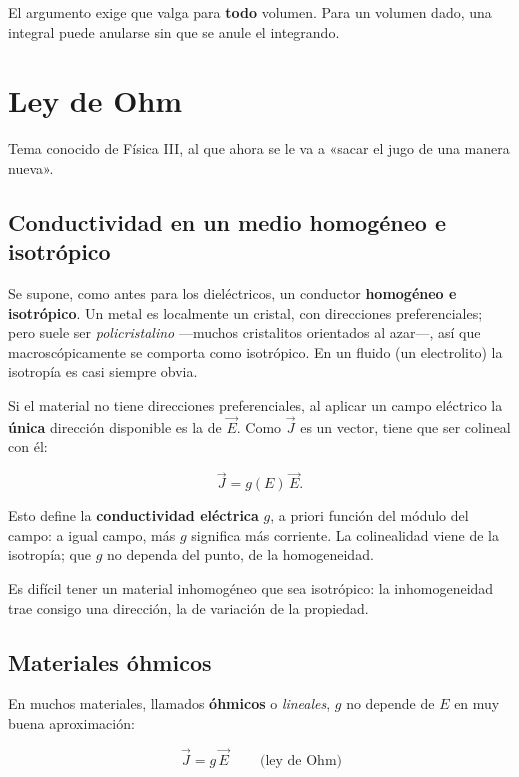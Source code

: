 \documentclass[12pt,a4paper]{article}
\begin{document}
\begin{notebox}
El argumento exige que valga para \textbf{todo} volumen. Para un volumen dado, una
integral puede anularse sin que se anule el integrando.
\end{notebox}

\section{Ley de Ohm}

Tema conocido de Física III, al que ahora se le va a «sacar el jugo de una
manera nueva».

\subsection{Conductividad en un medio homogéneo e isotrópico}

Se supone, como antes para los dieléctricos, un conductor \textbf{homogéneo e
isotrópico}. Un metal es localmente un cristal, con direcciones
preferenciales; pero suele ser \emph{policristalino} ---muchos cristalitos orientados
al azar---, así que macroscópicamente se comporta como isotrópico. En un fluido
(un electrolito) la isotropía es casi siempre obvia.

Si el material no tiene direcciones preferenciales, al aplicar un campo
eléctrico la \textbf{única} dirección disponible es la de $\vec E$. Como $\vec J$ es
un vector, tiene que ser colineal con él:

\[
\vec J = g(E)\,\vec E .
\]

Esto define la \textbf{conductividad eléctrica} $g$, a priori función del módulo del
campo: a igual campo, más $g$ significa más corriente. La colinealidad viene de
la isotropía; que $g$ no dependa del punto, de la homogeneidad.

\begin{notebox}
Es difícil tener un material inhomogéneo que sea isotrópico: la
inhomogeneidad trae consigo una dirección, la de variación de la propiedad.
\end{notebox}

\subsection{Materiales óhmicos}

En muchos materiales, llamados \textbf{óhmicos} o \emph{lineales}, $g$ no depende de $E$
en muy buena aproximación:

\begin{keybox}
\[
\boxed{\ \vec J = g\,\vec E\ } \qquad \text{(ley de Ohm)}
\]
\end{keybox}
\end{document}

